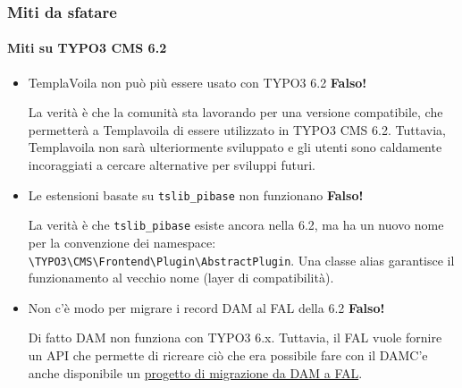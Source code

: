 \begin{frame}[fragile]
	\frametitle{Miti da sfatare}
	\framesubtitle{Miti su TYPO3 CMS 6.2}

	\begin{itemize}
		\item TemplaVoila non può più essere usato con TYPO3 6.2
			\tabto{9cm}\color{red}\textbf{\textrightarrow Falso!}\color{black}

			\smaller
				La verità è che la comunità sta lavorando per una versione compatibile, che permetterà a Templavoila di essere utilizzato in TYPO3 CMS 6.2. Tuttavia, Templavoila non sarà ulteriormente sviluppato e gli utenti sono caldamente incoraggiati a cercare alternative per sviluppi futuri.
			\normalsize

		\item Le estensioni basate su \texttt{tslib\_pibase} non funzionano
			\tabto{9cm}\color{red}\textbf{\textrightarrow Falso!}\color{black}

			\smaller
				La verità è che \texttt{tslib\_pibase} esiste ancora nella 6.2, ma ha un nuovo nome per la convenzione dei namespace: \texttt{\textbackslash TYPO3\textbackslash CMS\textbackslash Frontend\textbackslash Plugin\textbackslash AbstractPlugin}.\newline
				Una classe alias garantisce il funzionamento al vecchio nome (layer di compatibilità).
			\normalsize

		\item Non c'è modo per migrare i record DAM al FAL della 6.2
			\tabto{9cm}\color{red}\textbf{\textrightarrow Falso!}\color{black}

			\smaller
				Di fatto DAM non funziona con TYPO3 6.x. Tuttavia, il FAL vuole fornire un API che permette di ricreare ciò che era possibile fare con il DAMC'e anche disponibile un \href{https://github.com/fnagel/t3ext-dam_falmigration}{progetto di migrazione da DAM a FAL}.
			\normalsize

	\end{itemize}

\end{frame}


